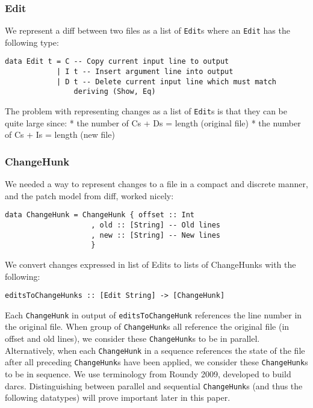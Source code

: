 \documentclass[]{article}
\begin{document}
\subsubsection{Edit}

We represent a diff between two files as a list of \texttt{Edit}s where
an \texttt{Edit} has the following type:

\begin{verbatim}
data Edit t = C -- Copy current input line to output 
            | I t -- Insert argument line into output
            | D t -- Delete current input line which must match
                deriving (Show, Eq)
\end{verbatim}

The problem with representing changes as a list of \texttt{Edit}s is
that they can be quite large since: * the number of Cs + Ds = length
(original file) * the number of Cs + Is = length (new file)

\subsubsection{ChangeHunk}

We needed a way to represent changes to a file in a compact and discrete
manner, and the patch model from diff, worked nicely:

\begin{verbatim}
data ChangeHunk = ChangeHunk { offset :: Int
                    , old :: [String] -- Old lines
                    , new :: [String] -- New lines
                    }
\end{verbatim}

We convert changes expressed in list of Edits to lists of ChangeHunks
with the following:

\begin{verbatim}
editsToChangeHunks :: [Edit String] -> [ChangeHunk]
\end{verbatim}

Each \texttt{ChangeHunk} in output of \texttt{editsToChangeHunk}
references the line number in the original file. When group of
\texttt{ChangeHunk}s all reference the original file (in offset and old
lines), we consider these \texttt{ChangeHunk}s to be in parallel.
Alternatively, when each \texttt{ChangeHunk} in a sequence references
the state of the file after all preceding \texttt{ChangeHunk}s have been
applied, we consider these \texttt{ChangeHunk}s to be in sequence. We
use terminology from Roundy 2009, developed to build darcs.
Distinguishing between parallel and sequential \texttt{ChangeHunk}s (and
thus the following datatypes) will prove important later in this paper.
\end{document}
